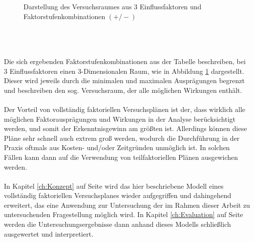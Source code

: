 \documentclass[
fontsize=10pt, 
listof = totoc,
parskip = half	
]{report}
\begin{document}
\begin{minipage}[t]{0.59\linewidth}
\begin{figure}[H]
\begin{tikzpicture}[x=0.75pt,y=0.75pt,yscale=-1,xscale=1, scale=0.6, every node/.style={scale=0.6}]
		\end{tikzpicture}
		\caption{Darstellung des Versuchsraumes aus 3 Einflussfaktoren und Faktorstufenkombinationen $(+/-)$}
		\label{fig:Versuchsplan}
	\end{figure}
\end{minipage}
\\\\\\
\noindent Die sich ergebenden Faktorstufenkombinationen aus der Tabelle beschreiben, bei 3 Einflussfaktoren einen 3-Dimensionalen Raum, wie in Abbildung \ref{fig:Versuchsplan} dargestellt. Dieser wird jeweils durch die minimalen und maximalen Ausprägungen begrenzt und beschreiben den sog. Versuchsraum, der alle möglichen Wirkungen enthält. 
\\\\
\noindent Der Vorteil von vollständig faktoriellen Versuchsplänen ist der, dass wirklich alle möglichen Faktorausprägungen und Wirkungen in der Analyse berücksichtigt werden, und somit der Erkenntnisgewinn am größten ist. Allerdings können diese Pläne sehr schnell auch extrem groß werden, wodurch die Durchführung in der Praxis oftmals aus Kosten- und/oder Zeitgründen unmöglich ist. In solchen  Fällen kann dann auf die Verwendung von teilfaktoriellen Plänen ausgewichen werden.
\\\\
\noindent In Kapitel \ref{ch:Konzept} auf Seite \pageref{ch:Konzept} wird das hier beschriebene Modell eines vollständig faktoriellen Versuchsplanes wieder aufgegriffen und dahingehend erweitert, das eine Anwendung zur Untersuchung der im Rahmen dieser Arbeit zu untersuchenden Fragestellung möglich wird. In Kapitel \ref{ch:Evaluation} auf Seite \pageref{ch:Evaluation} werden die Untersuchungsergebnisse dann anhand dieses Modells schließlich ausgewertet und interpretiert.
\end{document}
